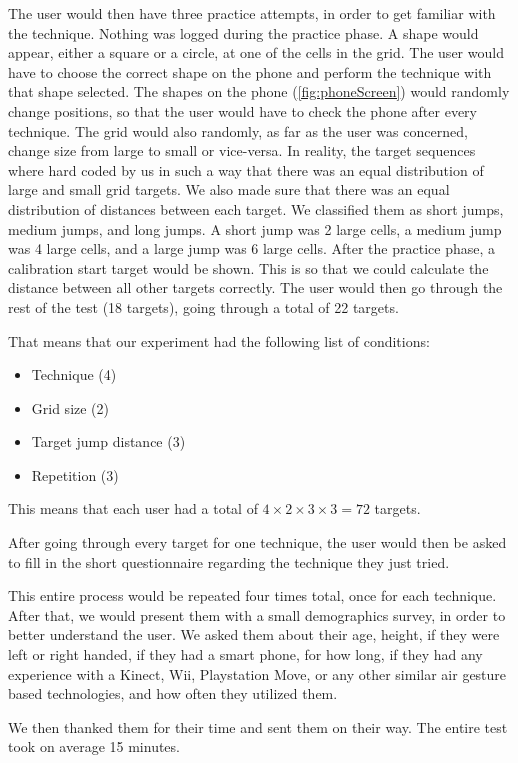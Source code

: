 The user would then have three practice attempts, in order to get familiar with the technique. 
Nothing was logged during the practice phase.
A shape would appear, either a square or a circle, at one of the cells in the grid. 
The user would have to choose the correct shape on the phone and perform the technique with that shape selected. 
The shapes on the phone (\cref{fig:phoneScreen}) would randomly change positions, so that the user would have to check the phone after every technique. 
The grid would also randomly, as far as the user was concerned, change size from large to small or vice-versa. 
In reality, the target sequences where hard coded by us in such a way that there was an equal distribution of large and small grid targets. 
We also made sure that there was an equal distribution of distances between each target. We classified them as short jumps, medium jumps, and long jumps. 
A short jump was 2 large cells, a medium jump was 4 large cells, and a large jump was 6 large cells.  
After the practice phase, a calibration start target would be shown. This is so that we could calculate the distance between all other targets correctly. 
The user would then go through the rest of the test (18 targets), going through a total of 22 targets. 

That means that our experiment had the following list of conditions:
\begin{itemize}
	 \item Technique (4)
	 \item Grid size (2)
	 \item Target jump distance (3)
	 \item Repetition (3)
\end{itemize}

This means that each user had a total of $4 \times 2 \times 3 \times 3 = 72 $ targets.

After going through every target for one technique, the user would then be asked to fill in the short questionnaire regarding the technique they just tried. 

This entire process would be repeated four times total, once for each technique. 
After that, we would present them with a small demographics survey, in order to better understand the user. 
We asked them about their age, height, if they were left or right handed, if they had a smart phone, for how long, if they had any experience with a Kinect, Wii, Playstation Move, or any other similar air gesture based technologies, and how often they utilized them. 

We then thanked them for their time and sent them on their way. 
The entire test took on average 15 minutes. 